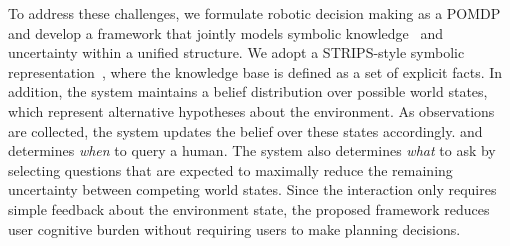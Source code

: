 To address these challenges, we formulate robotic decision making as a POMDP~\cite{kaelbling1998planning} and develop a framework that jointly models symbolic knowledge~\cite{davis1993knowledge} and uncertainty within a unified structure. We adopt a STRIPS-style symbolic representation~\cite{fikes1971strips}, where the knowledge base is defined as a set of explicit facts. In addition, the system maintains a belief distribution over possible world states, which represent alternative hypotheses about the environment. As observations are collected, the system updates the belief over these states accordingly.  and determines \textit{when} to query a human. The system also determines \textit{what} to ask by selecting questions that are expected to maximally reduce the remaining uncertainty between competing world states. Since the interaction only requires simple feedback about the environment state, the proposed framework reduces user cognitive burden without requiring users to make planning decisions.





